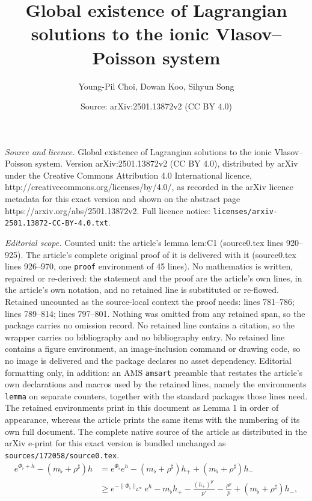 \documentclass[10pt,a4paper]{amsart}
\title{Global existence of Lagrangian solutions to the ionic Vlasov--Poisson system}
\author{Young-Pil Choi, Dowan Koo, Sihyun Song}
\date{Source: arXiv:2501.13872v2 (CC BY 4.0)}
\newcommand{\lt}{\left}
\newcommand{\rt}{\right}
\begin{document}
\maketitle

\noindent\emph{Source and licence.} Global existence of Lagrangian solutions to the ionic Vlasov--Poisson system. Version arXiv:2501.13872v2 (CC BY 4.0), distributed by arXiv under the Creative Commons Attribution 4.0 International licence, http://creativecommons.org/licenses/by/4.0/, as recorded in the arXiv licence metadata for this exact version and shown on the abstract page https://arxiv.org/abs/2501.13872v2. Full licence notice: \texttt{licenses/arxiv-2501.13872-CC-BY-4.0.txt}.\par\smallskip

\noindent\textit{Editorial scope.} Counted unit: the article's lemma lem:C1 (source0.tex lines 920--925). The article's complete original proof of it is delivered with it (source0.tex lines 926--970, one \texttt{proof} environment of 45 lines). No mathematics is written, repaired or re-derived: the statement and the proof are the article's own lines, in the article's own notation, and no retained line is substituted or re-flowed.  Retained uncounted as the source-local context the proof needs: lines 781--786; lines 789--814; lines 797--801.  Nothing was omitted from any retained span, so the package carries no omission record.  No retained line contains a citation, so the wrapper carries no bibliography and no bibliography entry.  No retained line contains a figure environment, an image-inclusion command or drawing code, so no image is delivered and the package declares no asset dependency.  Editorial formatting only, in addition: an AMS \texttt{amsart} preamble that restates the article's own declarations and macros used by the retained lines, namely the environments \texttt{lemma} on separate counters, together with the standard packages those lines need.  The retained environments print in this document as Lemma 1 in order of appearance, whereas the article prints the same items with the numbering of its own full document.  The complete native source of the article as distributed in the arXiv e-print for this exact version is bundled unchanged as \texttt{sources/172058/source0.tex}.
\begin{equation}\label{eq:jfm}
\begin{split}
e^{\Phi_\flat + h} - \lt(m_\flat + \rho^\sharp \rt)h &=  e^{\Phi_\flat}e^{h}-\lt(m_\flat + \rho^\sharp \rt) h_+ + \lt(m_\flat + \rho^\sharp \rt) h_- \\
&\ge e^{-\|\Phi_\flat\|_{L^\infty}}e^{h}-m_\flat h_+ - \frac{(h_+)^{p'}}{p'}- \frac{\rho^p}{p} + \lt(m_\flat + \rho^\sharp \rt) h_- ,
\end{split}
\end{equation}
\end{document}
